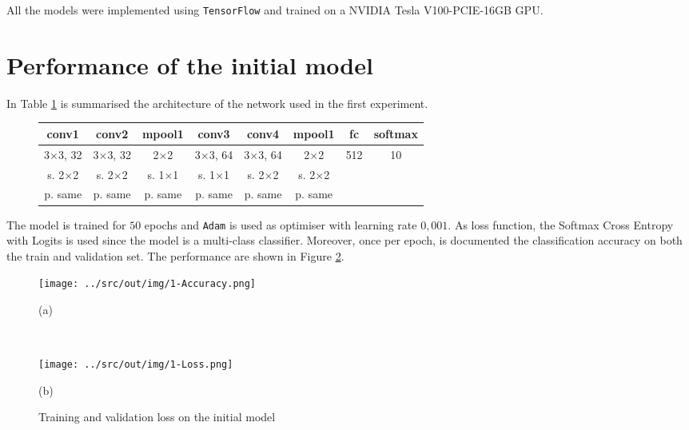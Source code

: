 \documentclass[a4paper,12pt]{article} %
\begin{document}
	All the models were implemented using \texttt{TensorFlow} and trained on a 
	NVIDIA Tesla V100-PCIE-16GB GPU.
	
	\section{Performance of the initial model}
	\label{section:model0}
	In Table \ref{tab:model0} is summarised the architecture of the network 
	used in the first experiment.	
	
	\begin{figure}[H]
		\centering
		
		\begin{tabular}{cccccccc}
		\toprule
		\textbf{conv1} & \textbf{conv2} & \textbf{mpool1} & \textbf{conv3} &
		\textbf{conv4} & \textbf{mpool1} &   \textbf{fc} &
		\textbf{softmax} \\
		\midrule
		3$\times$3,  32 & 3$\times$3, 32 & 2$\times$2 &3$\times$3, 64 & 
		3$\times$3, 64  & 2$\times$2  & 512 & 10\\
		s. 2$\times$2 &   s. 2$\times$2 &   s. 1$\times$1 & s. 1$\times$1  & s. 
		2$\times$2 & s. 2$\times$2 && \\
		p. same & p. same & p. same  & p. same & p. same & p. same &&\\
		\bottomrule
		\end{tabular}
		\label{tab:model0}
	\end{figure}
	
	The model is trained for $50$ epochs and \texttt{Adam} is used as 
	optimiser with learning rate $0,001$.
	As loss function, the Softmax Cross Entropy with Logits is used since the 
	model is a multi-class classifier. Moreover, once per epoch, is documented 
	the classification accuracy on both the train and validation set.
	The performance are shown in Figure \ref{fig:model0-performance}.
	
	\begin{figure}[H]
		\begin{minipage}[c]{.49\textwidth}
			\centering
			\texttt{[image: ../src/out/img/1-Accuracy.png]}
			\caption*{(a)}
		\end{minipage}
		~
		\begin{minipage}[c]{.49\textwidth}
			\centering
			\texttt{[image: ../src/out/img/1-Loss.png]}
			\caption*{(b)}
		\end{minipage}
		\caption{Training and validation loss on the initial model}
		\label{fig:model0-performance}
	\end{figure}
	
\end{document}
